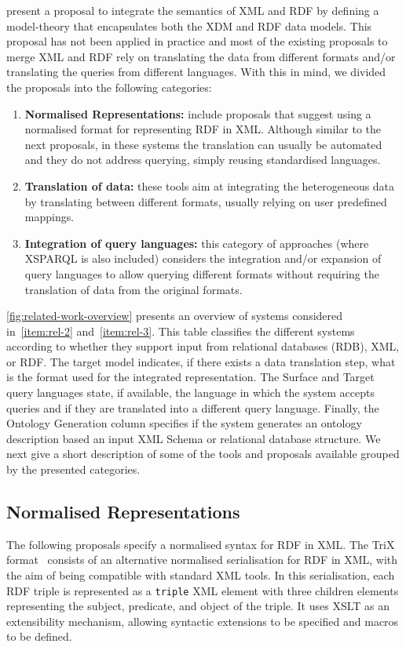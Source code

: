 \citet{Patel-SchneiderSimeon:2003aa} present a proposal to integrate the semantics of \ac{XML} and \ac{RDF} by defining
a model-theory that encapsulates both the \ac{XDM} and \ac{RDF} data models.
%
This proposal has not been applied in practice and most of the existing proposals to merge \ac{XML} and \ac{RDF} rely on
translating the data from different formats and/or translating the queries from different languages.
%
With this in mind, we divided the proposals into the following categories:
\begin{enumerate}[label=(\arabic*),noitemsep]
\item \label{item:rel-1} \textbf{Normalised Representations:} include proposals that suggest using a normalised format for representing
  \ac{RDF} in \ac{XML}.  Although similar to the next proposals, in these systems the translation can usually be
  automated and they do not address querying, simply reusing standardised languages.
\item \label{item:rel-2} \textbf{Translation of data:} these tools aim at integrating the heterogeneous data by translating between
  different formats, usually relying on user predefined mappings.
\item \label{item:rel-3} \textbf{Integration of query languages:} this category of approaches (where XSPARQL is also included) considers
  the integration and/or expansion of query languages to allow querying different formats without requiring the
  translation of data from the original formats.
\end{enumerate}
%
\cref{fig:related-work-overview} presents an overview of systems considered in~\ref{item:rel-2} and~\ref{item:rel-3}.
This table classifies the different systems according to whether they support input from relational databases (RDB),
\ac{XML}, or \ac{RDF}.  The target model indicates, if there exists a data translation step, what is the format used for
the integrated representation.  The Surface and Target query languages state, if available, the language in which the
system accepts queries and if they are translated into a different query language.  Finally, the Ontology Generation
column specifies if the system generates an ontology description based an input \ac{XML} Schema or relational database
structure.
%
We next give a short description of some of the tools and proposals available grouped by the presented categories.
%
\subsection*{Normalised Representations}
\label{sec:normalised-representations}
%
The following proposals specify a normalised syntax for \ac{RDF} in \ac{XML}.
%
The TriX format~\cite{CarrollStickler:2004aa} consists of an alternative normalised serialisation for \ac{RDF} in \ac{XML}, with the aim of
being compatible with standard \ac{XML} tools.  
%
In this serialisation, each \ac{RDF} triple is represented as a \texttt{triple} \ac{XML} element with three children
elements representing the subject, predicate, and object of the triple.
%
It uses \ac{XSLT} as an extensibility mechanism, allowing syntactic extensions to be specified and macros to be defined.

